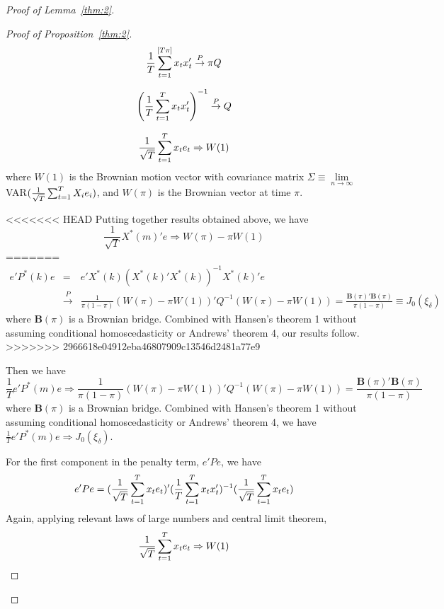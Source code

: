 \begin{proof}[Proof of Lemma~\ref{thm:2}]
\begin{proof}[Proof of Proposition~\ref{thm:2}]
    \begin{equation*}
        \frac{1}{T} \sum_{t=1}^{[T \pi]} x_t x_t' \stackrel{P}{\rightarrow} \pi Q
    \end{equation*}
    
    \begin{equation*}
        \left( \frac{1}{T} \sum_{t=1}^{T} x_t x_t' \right) ^{-1} \stackrel{P}{\rightarrow} Q
    \end{equation*}
    
    \begin{equation*}
        \frac{1}{\sqrt{T}} \sum_{t=1}^{T} x_t e_t \Rightarrow W(1)
    \end{equation*}
where $W(1)$ is the Brownian motion vector with covariance matrix $\Sigma \equiv \lim\limits_{n\to\infty}$VAR$(\frac{1}{\sqrt{T}}\sum_{t=1}^{T} X_i e_i)$, and $W(\pi)$ is the Brownian vector at time $\pi$.

<<<<<<< HEAD
\noindent Putting together results obtained above, we have
    \begin{equation*}
        \frac{1}{\sqrt{T}} X^{*}(m)'e \Rightarrow W(\pi) - \pi W(1)
    \end{equation*}
=======
\begin{eqnarray*}
e'P^{*}(k)e & = & e'X^{*}(k)(X^{*}(k)'X^{*}(k))^{-1}X^{*}(k)'e \\
            & \stackrel{P}{\rightarrow} & \frac{1}{\pi(1-\pi)} (W(\pi) - \pi W(1))'Q^{-1}(W(\pi) - \pi W(1)) =  \frac{\mathbf{B}(\pi)'\mathbf{B}(\pi)}{\pi(1-\pi)}\equiv J_0(\xi_{\delta})
\end{eqnarray*}
where $\mathbf{B}(\pi)$ is a Brownian bridge. Combined with Hansen's \cite{hansen2009averaging} theorem 1 without assuming conditional homoscedasticity or Andrews' \cite{andrews93} theorem 4, our results follow.
>>>>>>> 2966618e04912eba46807909c13546d2481a77e9

\noindent Then we have
    \begin{equation*}
        \frac{1}{T} e'P^{*}(m)e \Rightarrow \frac{1}{\pi(1-\pi)} (W(\pi) - \pi W(1))'Q^{-1}(W(\pi) - \pi W(1)) =  \frac{\mathbf{B}(\pi)'\mathbf{B}(\pi)}{\pi(1-\pi)}
    \end{equation*}
where $\mathbf{B}(\pi)$ is a Brownian bridge. Combined with Hansen's \cite{hansen2009averaging} theorem 1 without assuming conditional homoscedasticity or Andrews' \cite{andrews93} theorem 4, we have $\frac{1}{T} e'P^{*}(m)e \Rightarrow J_0(\xi_{\delta})$.

\noindent For the first component in the penalty term, $e'Pe$, we have
    \begin{equation*}
      e'Pe = (\frac{1}{\sqrt{T}} \sum_{t=1}^{T} x_t e_t)'(\frac{1}{T} \sum_{t=1}^{T} x_t x_t')^{-1}(\frac{1}{\sqrt{T}} \sum_{t=1}^{T} x_t e_t)
    \end{equation*}
\noindent Again, applying relevant laws of large numbers and central limit theorem, 
    \begin{equation*}
      \frac{1}{\sqrt{T}} \sum_{t=1}^{T} x_t e_t \Rightarrow W(1)
    \end{equation*}


\end{proof}
\end{proof}
